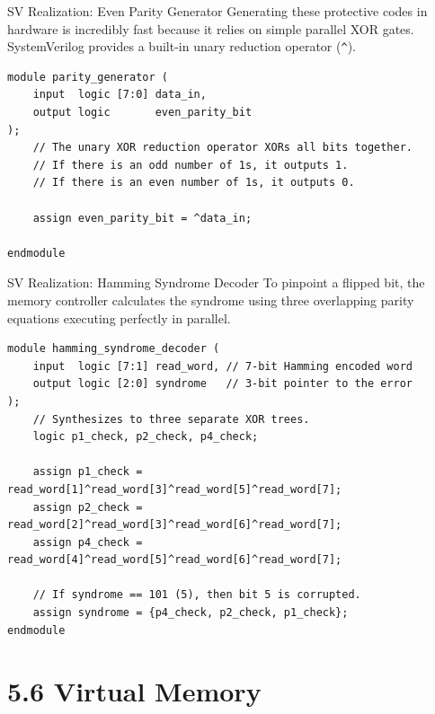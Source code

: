 \documentclass[aspectratio=169]{beamer}
\begin{document}
\begin{frame}[fragile]{SV Realization: Even Parity Generator}
Generating these protective codes in hardware is incredibly fast because it relies on simple parallel XOR gates. SystemVerilog provides a built-in unary reduction operator (\texttt{\^}).

{\scriptsize
\begin{verbatim}
module parity_generator (
    input  logic [7:0] data_in,
    output logic       even_parity_bit
);
    // The unary XOR reduction operator XORs all bits together.
    // If there is an odd number of 1s, it outputs 1.
    // If there is an even number of 1s, it outputs 0.
    
    assign even_parity_bit = ^data_in; 
    
endmodule
\end{verbatim}
}
\end{frame}

\begin{frame}[fragile]{SV Realization: Hamming Syndrome Decoder}
To pinpoint a flipped bit, the memory controller calculates the syndrome using three overlapping parity equations executing perfectly in parallel.

{\scriptsize
\begin{verbatim}
module hamming_syndrome_decoder (
    input  logic [7:1] read_word, // 7-bit Hamming encoded word
    output logic [2:0] syndrome   // 3-bit pointer to the error
);
    // Synthesizes to three separate XOR trees.
    logic p1_check, p2_check, p4_check;
    
    assign p1_check = read_word[1]^read_word[3]^read_word[5]^read_word[7];
    assign p2_check = read_word[2]^read_word[3]^read_word[6]^read_word[7];
    assign p4_check = read_word[4]^read_word[5]^read_word[6]^read_word[7];

    // If syndrome == 101 (5), then bit 5 is corrupted.
    assign syndrome = {p4_check, p2_check, p1_check};
endmodule
\end{verbatim}
}
\end{frame}

\section{5.6 Virtual Memory}
\end{document}
